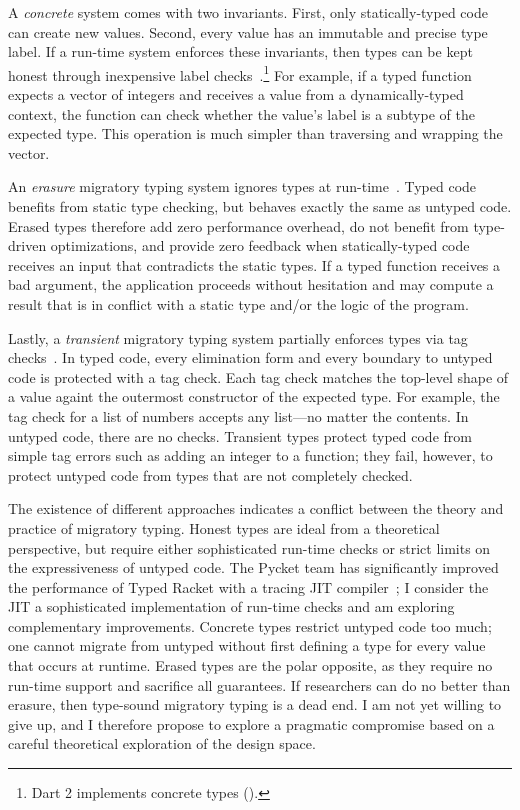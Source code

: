 A \emph{concrete}\/ system comes with two invariants.
First, only statically-typed code can create new values.
Second, every value has an immutable and precise type label.
If a run-time system enforces these invariants, then types can be kept honest
 through inexpensive label checks~\cite{mt-oopsla-2017,wnlov-popl-2010,bmt-ecoop-2010}.\footnote{Dart 2 implements concrete types ().}
For example, if a typed function expects a vector of integers and receives
 a value from a dynamically-typed context, the function can check whether the
 value's label is a subtype of the expected type.
This operation is much simpler than traversing and wrapping the vector.

An \emph{erasure}\/ migratory typing system ignores types at run-time~\cite{bat-ecoop-2014,bg-oopsla-1993,s-lisp-1990}.
Typed code benefits from static type checking, but behaves exactly the same
 as untyped code.
Erased types therefore add zero performance overhead, do not benefit from
 type-driven optimizations, and provide zero feedback
 when statically-typed code receives an input that contradicts the static
 types.
If a typed function receives a bad argument, the application proceeds without
 hesitation and may compute a result that is in conflict with a
 static type and/or the logic of the program.

Lastly, a \emph{transient}\/ migratory typing system partially enforces types
 via tag checks~\cite{vss-popl-2017,v-thesis-2019}.
In typed code, every elimination form and every boundary to untyped code
 is protected with a tag check.
Each tag check matches the top-level shape of a value againt the outermost
 constructor of the expected type.
For example, the tag check for a
 list of numbers accepts any list---no matter the contents.
In untyped code, there are no checks.
Transient types protect typed code from simple
 tag errors such as adding an integer to a function; they fail, however,
 to protect untyped code from types that are not completely checked.

The existence of different approaches indicates a conflict between the theory
 and practice of migratory typing.
Honest types are ideal from a theoretical perspective, but require either
 sophisticated run-time checks or strict limits on the expressiveness of
 untyped code.
The Pycket team has significantly improved the performance
 of Typed Racket with a tracing JIT compiler~\cite{bbst-oopsla-2017};
 I consider the JIT a sophisticated implementation of run-time checks
 and am exploring complementary improvements.
Concrete types restrict untyped code too much; one cannot migrate from untyped
 without first defining a type for every value that occurs at runtime.
Erased types are the polar opposite, as they require no run-time support
 and sacrifice all guarantees.
If researchers can do no better than erasure, then
 type-sound migratory typing is a dead end.
I am not yet willing to give up, and I therefore propose to explore a pragmatic
 compromise based on a careful theoretical exploration of the design space.
